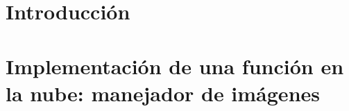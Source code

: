 \documentclass[12pt, twoside]{report}
\begin{document}
\tableofcontents
\listoffigures

\chapter{Introducción}


\chapter[Implementación de una \emph{FaaS}: manejador de imágnenes]{Implementación de una función en la nube: manejador de imágenes}
\label{cap:manejador-imagenes}


%
%
%
%
%
%
%
%
%
%
%
%
%
%
%
%
%
%



\end{document}
